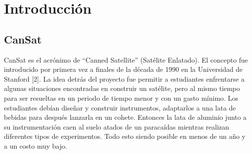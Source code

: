 

\chapter{Introducci\'{o}n}

\ifpdf
    \graphicspath{{1_introduction/figures/PNG/}{1_introduction/figures/PDF/}{1_introduction/figures/}}
\else
    \graphicspath{{1_introduction/figures/EPS/}{1_introduction/figures/}}
\fi







\section{CanSat} %
CanSat es el acr\'{o}nimo de “Canned Satellite” (Sat\'{e}lite Enlatado). El concepto fue introducido por primera vez a finales de la d\'{e}cada de 1990 en la Universidad de Stanford [2]. La idea detr\'{a}s del proyecto fue permitir a estudiantes enfrentarse a algunas situaciones encontradas en construir un sat\'{e}lite, pero al mismo tiempo para ser resueltas en un periodo de tiempo menor y con un gasto m\'{i}nimo. Los estudiantes deb\'{i}an dise\~{n}ar y construir instrumentos, adaptarlos a una lata de bebidas para despu\'{e}s lanzarla en un cohete. Entonces la lata de aluminio junto a su instrumentaci\'{o}n caen al suelo atados de un paraca\'{i}das mientras realizan diferentes tipos de experimentos. Todo esto siendo posible en menos de un a\~{n}o y a un costo muy bajo.



